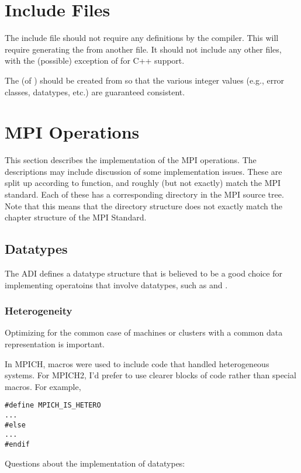 \documentclass{article}
\begin{document}
\section{Include Files}
The include file  should not require any 
definitions by the compiler.  This will require generating the
 from another file.  It should not include any other
files, with the (possible) exception of  for C++ support.

The  (of ) should be created from
 so that the various integer values (e.g., error classes,
datatypes, etc.) are guaranteed consistent.

\section{MPI Operations}
This section describes the implementation of the MPI operations.  The
descriptions may include discussion of some implementation issues.
These are split up according to function, and roughly (but not
exactly) match the MPI standard.  Each of these has a corresponding
directory in the MPI source tree.  Note that this means that the
directory structure does not exactly match the chapter structure of
the MPI Standard.

\subsection{Datatypes}
The ADI defines a datatype structure that is believed to be a good
choice for implementing operatoins that involve datatypes, such as
 and .

\subsubsection{Heterogeneity}
\label{sec:hetero}
Optimizing for the common case of machines or clusters with a common
data representation is important.  

In MPICH, macros were used to include code that handled heterogeneous
systems.  For MPICH2, I'd prefer to use clearer blocks of code rather
than special macros.  For example,
\begin{verbatim}
#define MPICH_IS_HETERO
...
#else
...
#endif
\end{verbatim}

Questions about the implementation of datatypes:
\end{document}
